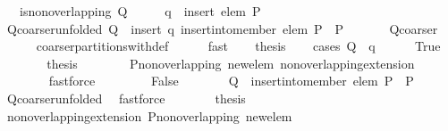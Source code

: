 \begin{isabellebody}
\ \ \ {\isachardoublequoteopen}is{\isacharunderscore}non{\isacharunderscore}overlapping\ Q{\isachardoublequoteclose}\isanewline
%
\isadelimproof
%
\endisadelimproof
%
\isatagproof
{}\isamarkupfalse%
\ {\isacharminus}\isanewline
\ \ \isamarkupfalse%
\ {\isacharquery}q\ {\isacharequal}\ {\isachardoublequoteopen}insert\ {\isacharbraceleft}elem{\isacharbraceright}\ P{\isachardoublequoteclose}\isanewline
\ \ \isamarkupfalse%
\ Q{\isacharunderscore}coarser{\isacharunderscore}unfolded{\isacharcolon}\ {\isachardoublequoteopen}Q\ {\isasymin}\ insert\ {\isacharquery}q\ {\isacharparenleft}insert{\isacharunderscore}into{\isacharunderscore}member\ elem\ P\ {\isacharbackquote}\ P{\isacharparenright}{\isachardoublequoteclose}\ \isanewline
\ \ \ \ \isamarkupfalse%
\ Q{\isacharunderscore}coarser\ \isanewline
\ \ \ \ \isamarkupfalse%
\ coarser{\isacharunderscore}partitions{\isacharunderscore}with{\isacharunderscore}def\isanewline
\ \ \ \ \isamarkupfalse%
\ fast\isanewline
\ \ \isamarkupfalse%
\ {\isacharquery}thesis\isanewline
\ \ \isamarkupfalse%
\ {\isacharparenleft}cases\ {\isachardoublequoteopen}Q\ {\isacharequal}\ {\isacharquery}q{\isachardoublequoteclose}{\isacharparenright}\isanewline
\ \ \ \ \isamarkupfalse%
\ True\isanewline
\ \ \ \ \isamarkupfalse%
\ \isamarkupfalse%
\ {\isacharquery}thesis\isanewline
\ \ \ \ \ \ \isamarkupfalse%
\ P{\isacharunderscore}non{\isacharunderscore}overlapping\ new{\isacharunderscore}elem\ non{\isacharunderscore}overlapping{\isacharunderscore}extension{}\isanewline
\ \ \ \ \ \ \isamarkupfalse%
\ fastforce\isanewline
\ \ \isamarkupfalse%
\isanewline
\ \ \ \ \isamarkupfalse%
\ False\isanewline
\ \ \ \ \isamarkupfalse%
\ \isamarkupfalse%
\ {\isachardoublequoteopen}Q\ {\isasymin}\ {\isacharparenleft}insert{\isacharunderscore}into{\isacharunderscore}member\ elem\ P{\isacharparenright}\ {\isacharbackquote}\ P{\isachardoublequoteclose}\ \isamarkupfalse%
\ Q{\isacharunderscore}coarser{\isacharunderscore}unfolded\ \isamarkupfalse%
\ fastforce\isanewline
\ \ \ \ \isamarkupfalse%
\ \isamarkupfalse%
\ {\isacharquery}thesis\ \isamarkupfalse%
\ non{\isacharunderscore}overlapping{\isacharunderscore}extension{}\ P{\isacharunderscore}non{\isacharunderscore}overlapping\ new{\isacharunderscore}elem\ \isamarkupfalse%

\end{isabellebody}
